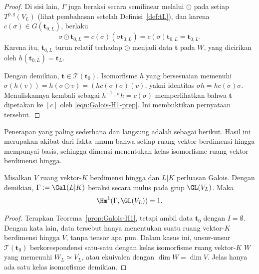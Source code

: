 \begin{proof}
	Di sisi lain, $\Gamma$ juga beraksi secara semilinear melalui $\odot$ pada
	setiap $T^{p,q}(V_L)$ (lihat pembahasan setelah Definisi~\ref{def:tL}),
	dan karena $c(\sigma)\in G(\mathbf{t}_{0,L})$, berlaku
	\[
	\sigma\odot\mathbf{t}_{0,L}
	=c(\sigma)(\sigma\mathbf{t}_{0,L})
	=c(\sigma)\mathbf{t}_{0,L}
	=\mathbf{t}_{0,L}.
	\]
	Karena itu, $\mathbf{t}_{0,L}$ turun relatif terhadap $\odot$ menjadi data
	$\mathbf{t}$ pada $W$, yang dicirikan oleh
	$h(\mathbf{t}_{0,L})=\mathbf{t}_L$.

	Dengan demikian, $\mathbf{t}\in\mathcal{T}(\mathbf{t}_0)$. Isomorfisme
	$h$ yang bersesuaian memenuhi
	$\sigma(h(v))=h(\sigma\odot v)=(hc(\sigma)\sigma)(v)$, yakni identitas
	$\sigma h=hc(\sigma)\sigma$. Menuliskannya kembali sebagai
	$h^{-1}\cdot{}^\sigma h=c(\sigma)$ memperlihatkan bahwa $\mathbf{t}$
	dipetakan ke $[c]$ oleh \eqref{eqn:Galois-H1-prep}. Ini membuktikan
	pernyataan tersebut.
\end{proof}

Penerapan yang paling sederhana dan langsung adalah sebagai berikut. Hasil
ini merupakan akibat dari fakta umum bahwa setiap ruang vektor berdimensi hingga
mempunyai basis, sehingga dimensi menentukan kelas isomorfisme ruang vektor
berdimensi hingga.

\begin{theorem}\label{prop:Hilbert-90-GL}
	Misalkan $V$ ruang vektor-$K$ berdimensi hingga dan $L|K$ perluasan
	Galois. Dengan demikian, $\Gamma:=\Gal(L|K)$ beraksi secara mulus pada
	grup $\GL(V_L)$. Maka
	\[
	\Hm^1(\Gamma,\GL(V_L))=1.
	\]
\end{theorem}
\begin{proof}
	Terapkan Teorema~\ref{prop:Galois-H1}, tetapi ambil data $\mathbf{t}_0$
	dengan $I=\emptyset$. Dengan kata lain, data tersebut hanya menentukan
	suatu ruang vektor-$K$ berdimensi hingga $V$, tanpa tensor apa pun. Dalam
	kasus ini, unsur-unsur $\mathscr{T}(\mathbf{t}_0)$ berkorespondensi
	satu-satu dengan kelas isomorfisme ruang vektor-$K$ $W$ yang memenuhi
	$W_L\simeq V_L$, atau ekuivalen dengan $\dim W=\dim V$. Jelas hanya ada
	satu kelas isomorfisme demikian.
\end{proof}

